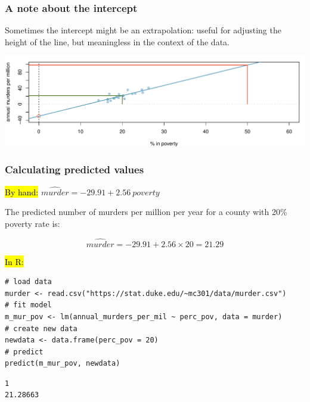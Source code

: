 \documentclass[11pt,containsverbatim,handout,xcolor=xelatex,dvipsnames,table]{beamer}
\begin{document}
\begin{frame}
\frametitle{A note about the intercept}

Sometimes the intercept might be an extrapolation: useful for adjusting the height of the line, but meaningless in the context of the data.

\begin{center}
\includegraphics[width=\textwidth]{figures/murder/annual_murders_per_mil_perc_pov_wide}
\end{center}

\end{frame}


\begin{frame}[fragile]
\frametitle{Calculating predicted values}

\hl{By hand:} $\widehat{murder} = -29.91 + 2.56~poverty$

The predicted number of murders per million per year for a county with 20\% poverty rate is: 

\pause

\[ \widehat{murder} = -29.91 + 2.56 \times 20 = 21.29 \]

\vfill

\pause

\hl{In R:}

{\scriptsize
\begin{Verbatim}[frame=single, formatcom=\color{blue}]
# load data
murder <- read.csv("https://stat.duke.edu/~mc301/data/murder.csv")
# fit model
m_mur_pov <- lm(annual_murders_per_mil ~ perc_pov, data = murder)
# create new data
newdata <- data.frame(perc_pov = 20)
# predict
predict(m_mur_pov, newdata)
\end{Verbatim}
}

\pause

{\scriptsize
\begin{Verbatim}[frame=single, formatcom=\color{gray}]
       1 
21.28663 
\end{Verbatim}
}

\end{frame}
\end{document}
